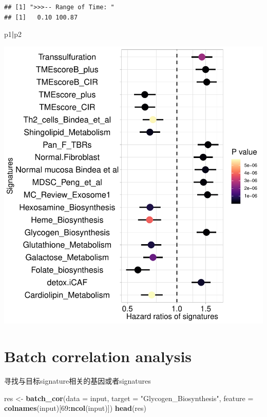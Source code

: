 \documentclass[
  12pt,
]{book}
\newenvironment{Shaded}{\begin{snugshade}}{\end{snugshade}}
\newcommand{\AttributeTok}[1]{\textcolor[rgb]{0.13,0.29,0.53}{#1}}
\newcommand{\DecValTok}[1]{\textcolor[rgb]{0.00,0.00,0.81}{#1}}
\newcommand{\FunctionTok}[1]{\textcolor[rgb]{0.13,0.29,0.53}{\textbf{#1}}}
\newcommand{\NormalTok}[1]{#1}
\newcommand{\OtherTok}[1]{\textcolor[rgb]{0.56,0.35,0.01}{#1}}
\newcommand{\SpecialCharTok}[1]{\textcolor[rgb]{0.81,0.36,0.00}{\textbf{#1}}}
\newcommand{\StringTok}[1]{\textcolor[rgb]{0.31,0.60,0.02}{#1}}
\theoremstyle{definition}
\theoremstyle{definition}
\theoremstyle{definition}
\theoremstyle{definition}
\theoremstyle{remark}
\begin{document}
\begin{verbatim}
## [1] ">>>-- Range of Time: "
## [1]   0.10 100.87
\end{verbatim}

\begin{Shaded}
\begin{Highlighting}[]
\NormalTok{p1}\SpecialCharTok{|}\NormalTok{p2}
\end{Highlighting}
\end{Shaded}

\includegraphics{_main_files/figure-latex/unnamed-chunk-37-1.pdf}

\hypertarget{batch-correlation-analysis}{%
\section{Batch correlation analysis}\label{batch-correlation-analysis}}

寻找与目标signature相关的基因或者signatures

\begin{Shaded}
\begin{Highlighting}[]
\NormalTok{res }\OtherTok{\textless{}{-}} \FunctionTok{batch\_cor}\NormalTok{(}\AttributeTok{data =}\NormalTok{ input, }\AttributeTok{target =} \StringTok{"Glycogen\_Biosynthesis"}\NormalTok{, }\AttributeTok{feature =} \FunctionTok{colnames}\NormalTok{(input)[}\DecValTok{69}\SpecialCharTok{:}\FunctionTok{ncol}\NormalTok{(input)])}
\FunctionTok{head}\NormalTok{(res)}
\end{Highlighting}
\end{Shaded}
\end{document}
